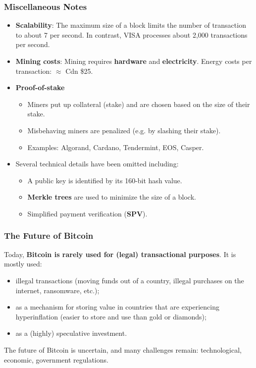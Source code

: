 \documentclass[12pt,titlepage]{article}
\begin{document}
\subsubsection{Miscellaneous Notes}
\begin{itemize}
	\item \textbf{Scalability}: The maximum size of a block limits the number of transaction to about 7 per second. In contrast, VISA processes about 2,000 transactions per second.
	\item \textbf{Mining costs}: Mining requires \textbf{hardware} and \textbf{electricity}. Energy costs per transaction: $\approx$ Cdn \$25.
	\item \textbf{Proof-of-stake}\begin{itemize}
		\item Miners put up collateral (stake) and are chosen based on the size of their stake.
		\item Misbehaving miners are penalized (e.g. by slashing their stake).
		\item Examples: Algorand, Cardano, Tendermint, EOS, Casper.
	\end{itemize}
	\item Several technical details have been omitted including:\begin{itemize}
		\item A public key is identified by its 160-bit hash value.
		\item \textbf{Merkle trees} are used to minimize the size of a block.
		\item Simplified payment verification (\textbf{SPV}).
	\end{itemize}
\end{itemize}

\subsubsection{The Future of Bitcoin}
Today, \textbf{Bitcoin is rarely used for (legal) transactional purposes}. It is mostly used:\begin{itemize}
	\item illegal transactions (moving funds out of a country, illegal purchases on the internet, ransomware, etc.);
	\item as a mechanism for storing value in countries that are experiencing hyperinflation (easier to store and use than gold or diamonds);
	\item as a (highly) speculative investment.
\end{itemize}
The future of Bitcoin is uncertain, and many challenges remain: technological, economic, government regulations.
\end{document}
